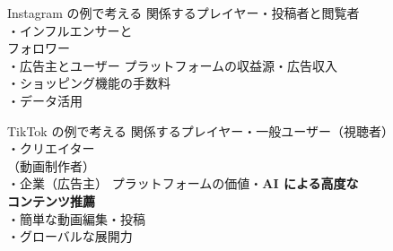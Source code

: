 \documentclass[aspectratio=169]{beamer}
\begin{document}
\begin{frame}{Instagram の例で考える}
{関係するプレイヤー}{・投稿者と閲覧者\\・インフルエンサーと\\\quad フォロワー\\・広告主とユーザー}
{プラットフォームの収益源}{・広告収入\\・ショッピング機能の手数料\\・データ活用}
\end{frame}

\begin{frame}{TikTok の例で考える}
{関係するプレイヤー}{・一般ユーザー（視聴者）\\・クリエイター\\\quad（動画制作者）\\・企業（広告主）}
{プラットフォームの価値}{・\textbf{AI による高度な\\\quad コンテンツ推薦}\\・簡単な動画編集・投稿\\・グローバルな展開力}
\end{frame}

\end{document}
